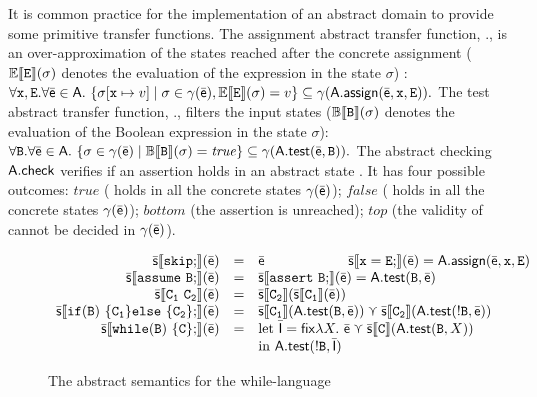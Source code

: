 \documentclass{llncs}
\newcommand{\sopra}{\vspace{-.3cm}}
\begin{document}
It is common practice for the implementation of an
abstract domain  to provide some primitive transfer functions.
The assignment abstract transfer function, .\aassign, is an
over-approximation of the states reached after the concrete assignment ($\semantica{E}{\code{E}}(\sigma)$ denotes the evaluation of the expression  in the state $\sigma$) :
  \(
  \forall \code{x}, \code{E}. \forall \ael{e} \in \dom{A}.\ \{ \sigma[\code{x} \mapsto v] \mid \sigma \in \gamma(\ael{e}), \semantica{E}{\code{E}}(\sigma) = v \} \subseteq \gamma(\dom{A}.\aassign(\ael{e}, \code{x}, \code{E})).
  \)
The test abstract transfer function, .\atest, filters the input states ($\semantica{B}{\code{B}}(\sigma)$ denotes the evaluation of the Boolean  expression  in the state $\sigma$):
\(
\forall \code{B}. \forall \ael{e} \in  \dom{A}.\ \{ \sigma \in \gamma(\ael{e}) \mid \semantica{B}{\code{B}}(\sigma) = \mathit{true} \} \subseteq \gamma(\dom{A}.\atest(\ael{e}, \code{B})).
\)
The abstract checking $\dom{A}.\checkif$ verifies if an assertion  holds in an abstract state .
It has four possible outcomes: $\mathit{true}$ ( holds in all the concrete states $\gamma(\ael{e})$); $\mathit{false}$ ( holds in all the concrete states $\gamma(\ael{e})$); $\mathit{bottom}$ (the assertion is unreached); $\mathit{top}$ (the validity of  cannot be decided in $\gamma(\ael{e})$).


\begin{figure}[t]
\[
\begin{array}{rcl}
\asem{\code{skip};}(\ael{e}) & = & \ael{e} \qquad \qquad \qquad
\asem{\code{x = E};}(\ael{e})  =  \adom{A}.\assign(\ael{e}, \code{x}, \code{E}) \\
\asem{\code{assume}\ \code{B};}(\ael{e}) &=& \asem{\code{assert}\ \code{B};}(\ael{e}) = \dom{A}.\guard(\code{B}, \ael{e}) \\
\asem{\code{C_1\ C_2}}(\ael{e}) & = & \asem{\code{C_2}}(\asem{\code{C_1}}(\ael{e})) \\
\asem{ \If(\code{B})~ \{ \code{C}_1 \} \Else~\{ \code{C}_2 \};}(\ael{e}) & = & \asem{\code{C_1}}(\adom{A}.\guard(\code{B}, \ael{e})) \cjoin \asem{\code{C_2}}(\adom{A}.\guard(\code{!B}, \ael{e})) \\
\asem{\While(\code{B})~\{\code{C}\};}(\ael{e}) & = & \mathrm{let}\ \ael{I} = \mathsf{fix} \lambda X.\ \ael{e} \cjoin \asem{C}(\adom{A}.\guard(\code{B}, X)) \\
& & \mathrm{in}\ \dom{A}.\guard(\code{!B}, \ael{I}) 
\end{array}
\]
\caption{The abstract semantics for the while-language}
\label{fig:WhileLanguageSemantics}
\end{figure}
\end{document}
